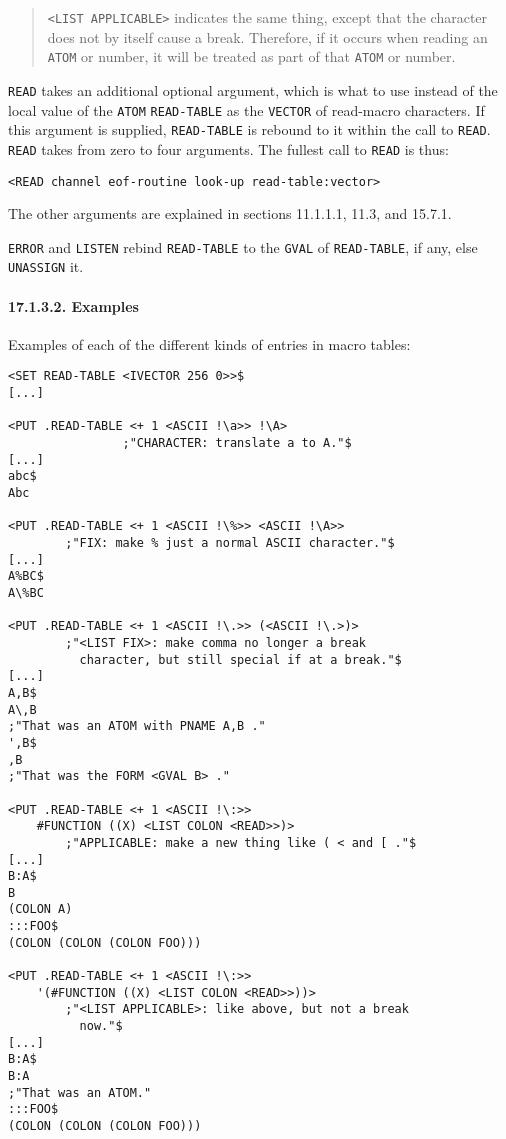\documentclass[a4paper,]{article}
\let\oldparagraph\paragraph
\renewcommand{\paragraph}[1]{\oldparagraph{#1}\mbox{}}
\begin{document}
\begin{quote}
\texttt{\textless{}LIST\ APPLICABLE\textgreater{}} indicates the same thing, except that the character does not by itself
cause a break. Therefore, if it occurs when reading an \texttt{ATOM} or number, it will be treated as part of that
\texttt{ATOM} or number.
\end{quote}

\texttt{READ} takes an additional optional argument, which is what to use instead of the local value of the \texttt{ATOM}
\texttt{READ-TABLE} as the \texttt{VECTOR} of read-macro characters. If this argument is supplied, \texttt{READ-TABLE} is
rebound to it within the call to \texttt{READ}. \texttt{READ} takes from zero to four arguments. The fullest call to
\texttt{READ} is thus:

\begin{verbatim}
<READ channel eof-routine look-up read-table:vector>
\end{verbatim}

The other arguments are explained in sections 11.1.1.1, 11.3, and 15.7.1.

\texttt{ERROR} and \texttt{LISTEN} rebind \texttt{READ-TABLE} to the \texttt{GVAL} of \texttt{READ-TABLE}, if any, else
\texttt{UNASSIGN} it.

\paragraph{17.1.3.2. Examples}\label{examples-5}

Examples of each of the different kinds of entries in macro tables:

\begin{verbatim}
<SET READ-TABLE <IVECTOR 256 0>>$
[...]

<PUT .READ-TABLE <+ 1 <ASCII !\a>> !\A>
                ;"CHARACTER: translate a to A."$
[...]
abc$
Abc

<PUT .READ-TABLE <+ 1 <ASCII !\%>> <ASCII !\A>>
        ;"FIX: make % just a normal ASCII character."$
[...]
A%BC$
A\%BC

<PUT .READ-TABLE <+ 1 <ASCII !\.>> (<ASCII !\.>)>
        ;"<LIST FIX>: make comma no longer a break
          character, but still special if at a break."$
[...]
A,B$
A\,B
;"That was an ATOM with PNAME A,B ."
',B$
,B
;"That was the FORM <GVAL B> ."

<PUT .READ-TABLE <+ 1 <ASCII !\:>>
    #FUNCTION ((X) <LIST COLON <READ>>)>
        ;"APPLICABLE: make a new thing like ( < and [ ."$
[...]
B:A$
B
(COLON A)
:::FOO$
(COLON (COLON (COLON FOO)))

<PUT .READ-TABLE <+ 1 <ASCII !\:>>
    '(#FUNCTION ((X) <LIST COLON <READ>>))>
        ;"<LIST APPLICABLE>: like above, but not a break
          now."$
[...]
B:A$
B:A
;"That was an ATOM."
:::FOO$
(COLON (COLON (COLON FOO)))
\end{verbatim}
\end{document}

